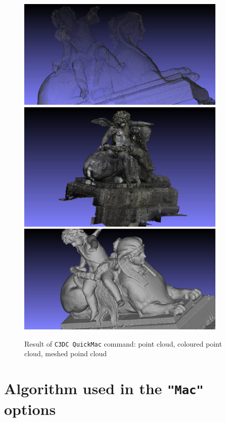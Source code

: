 \begin{figure}[H]
\begin{center}
\includegraphics[width=100mm]{FIGS/Ange/snapshot00.jpg}
\includegraphics[width=100mm]{FIGS/Ange/snapshot01.jpg}
\includegraphics[width=100mm]{FIGS/Ange/snapshot201.jpg}
\end{center}
\caption{Result of {\tt C3DC QuickMac} command: point cloud, coloured point cloud, meshed poind cloud}
\label{FIG:Angel:Result}
\end{figure}


\section{Algorithm used in the {\tt "Mac"} options}

